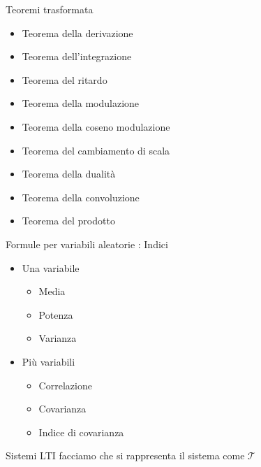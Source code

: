 \documentclass{article}
\begin{document}
Teoremi trasformata
\begin{itemize}
\item Teorema della derivazione
\item Teorema dell'integrazione
\item Teorema del ritardo
\item Teorema della modulazione %
\item Teorema della coseno modulazione %
\item Teorema del cambiamento di scala %
\item Teorema della dualità %
\item Teorema della convoluzione
\item Teorema del prodotto
\end{itemize}

Formule per variabili aleatorie : Indici
\begin{itemize}
\item Una variabile \begin{itemize}
\item Media
\item Potenza
\item Varianza
\end{itemize}
\item Più variabili \begin{itemize}
  \item Correlazione
  \item Covarianza
  \item Indice di covarianza
\end{itemize}
\end{itemize}

Sistemi LTI
facciamo che si rappresenta il sistema come $\mathcal {T}$
\end{document}
